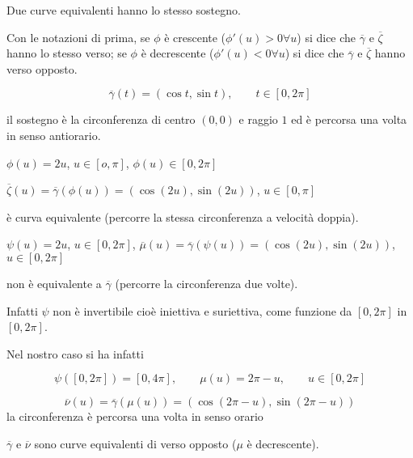 \begin{attbar}
	Due curve equivalenti hanno lo stesso sostegno.
\end{attbar}


\begin{definition}
	Con le notazioni di prima, se $\phi$ è crescente {\color{blue}($\phi'(u)>0 \forall u$)} si dice che $\overline{\gamma}$ e $\overline{\zeta}$ hanno lo stesso verso; se $\phi$ è decrescente {\color{blue}($\phi'(u)<0 \forall u $)} si dice che $\overline{\gamma}$ e $\overline{\zeta}$ hanno verso opposto.

\end{definition}


\begin{exbar}
\begin{example}
	$$\overline{\gamma}(t)=(\cos t, \sin t), \qquad t\in [0,2\pi]$$
	
	il sostegno è la circonferenza di centro $(0,0)$ e raggio $1$ ed è percorsa una volta  in senso antiorario. 
	
	{\centering $\phi(u)=2u$, $u\in [o,\pi]$, $\phi(u)\in[0,2\pi]$
		
		$\overline{\zeta}(u)=\overline{\gamma}(\phi(u))=(\cos (2u),\sin (2u))$, $u \in [0,\pi]$
	\par}
	
	è curva equivalente {\color{blue}(percorre la stessa circonferenza a velocità doppia)}.
	
	{\centering $\psi(u)=2u$, $u \in [0, 2\pi]$, $\overline{\mu}(u)=\overline{\gamma}(\psi(u))=(\cos(2u), \sin (2u))$, $u \in [0,2\pi]$ \par}
	
	non è equivalente a $\overline{\gamma}$ {\color{blue}(percorre la circonferenza due volte)}. 
	
	Infatti $\psi$ non è invertibile {\color{blue}cioè iniettiva e suriettiva,} come funzione da $[0,2\pi]$ in $[0,2\pi]$. 
	
	Nel nostro caso si ha infatti 
	
	$$\psi ([0,2\pi])=[0,4\pi], \qquad \mu (u)=2\pi-u, \qquad u \in [0,2\pi]$$
	
	$$\overline{\nu}(u)=\overline{\gamma}(\mu(u))=(\cos(2\pi-u),\sin(2\pi-u))$$ {\color{blue}la circonferenza è percorsa una volta in senso orario} 
	
	$\overline{\gamma}$ e $\overline{\nu}$ sono curve equivalenti di verso opposto ($\mu$ è decrescente).
\end{example}
\end{exbar}


